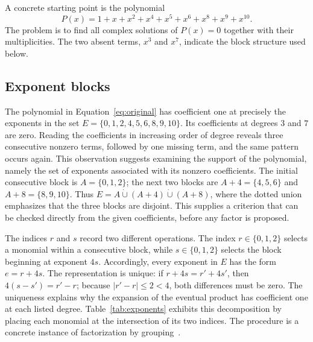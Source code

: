 \documentclass[11pt,a4paper]{article}
\numberwithin{equation}{section}
\theoremstyle{uprightpaper}
\begin{document}
A concrete starting point is the polynomial
\begin{equation}\label{eq:original}
 P(x)=1+x+x^2+x^4+x^5+x^6+x^8+x^9+x^{10}.
\end{equation}
The problem is to find all complex solutions of $P(x)=0$ together with their
multiplicities. The two absent terms, $x^3$ and $x^7$, indicate the
block structure used below.

\subsection{Exponent blocks}\label{sec:exponents}

The polynomial in Equation~\eqref{eq:original} has coefficient one at
precisely the exponents in the set
$E=\{0,1,2,4,5,6,8,9,10\}$. Its coefficients at degrees
$3$ and $7$ are zero. Reading the coefficients in increasing
order of degree reveals three consecutive nonzero terms, followed
by one missing term, and the same pattern occurs again. This
observation suggests examining the support of the polynomial,
namely the set of exponents associated with its nonzero
coefficients. The initial consecutive block is
$A=\{0,1,2\}$; the next two blocks are $A+4=\{4,5,6\}$
and $A+8=\{8,9,10\}$. Thus
$E=A\mathbin{\dot\cup}(A+4)\mathbin{\dot\cup}(A+8)$,
where the dotted union emphasizes that the three blocks are
disjoint. This supplies a criterion that can be checked directly
from the given coefficients, before any factor is proposed.

The indices $r$ and $s$ record two different operations. The
index $r\in\{0,1,2\}$ selects a monomial within a consecutive
block, while $s\in\{0,1,2\}$ selects the block beginning at
exponent $4s$. Accordingly, every exponent in $E$ has the form
$e=r+4s$. The representation is unique: if
$r+4s=r'+4s'$, then $4(s-s')=r'-r$; because
$|r'-r|\leq2<4$, both differences must be zero. The uniqueness
explains why the expansion of the eventual product has
coefficient one at each listed degree. Table~\ref{tab:exponents}
exhibits this decomposition by placing each monomial at the
intersection of its two indices. The procedure is a concrete
instance of factorization by grouping~\cite{barbeau1989}.
\end{document}
